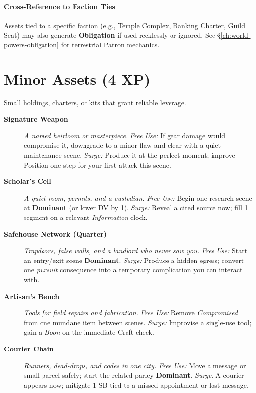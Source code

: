 \paragraph{Cross‑Reference to Faction Ties}
Assets tied to a specific faction (e.g., Temple Complex, Banking Charter, Guild Seat) may also generate \textbf{Obligation} if used recklessly or ignored. See \S\ref{ch:world-powers-obligation} for terrestrial Patron mechanics.

\section{Minor Assets (4 XP)}
Small holdings, charters, or kits that grant reliable leverage.
\begin{description}
  \item[\textbf{Signature Weapon}]  \emph{A named heirloom or masterpiece.} \emph{Free Use:} If gear damage would compromise it, downgrade to a minor flaw and clear with a quiet maintenance scene. \emph{Surge:} Produce it at the perfect moment; improve Position one step for your first attack this scene.

  \item[\textbf{Scholar's Cell}]  \emph{A quiet room, permits, and a custodian.} \emph{Free Use:} Begin one research scene at \textbf{Dominant} (or lower DV by 1). \emph{Surge:} Reveal a cited source now; fill 1 segment on a relevant \emph{Information} clock.

  \item[\textbf{Safehouse Network (Quarter)}]  \emph{Trapdoors, false walls, and a landlord who never saw you.} \emph{Free Use:} Start an entry/exit scene \textbf{Dominant}. \emph{Surge:} Produce a hidden egress; convert one \emph{pursuit} consequence into a temporary complication you can interact with.

  \item[\textbf{Artisan's Bench}]  \emph{Tools for field repairs and fabrication.} \emph{Free Use:} Remove \emph{Compromised} from one mundane item between scenes. \emph{Surge:} Improvise a single-use tool; gain a \emph{Boon} on the immediate Craft check.

  \item[\textbf{Courier Chain}]  \emph{Runners, dead-drops, and codes in one city.} \emph{Free Use:} Move a message or small parcel safely; start the related parley \textbf{Dominant}. \emph{Surge:} A courier appears now; mitigate 1 SB tied to a missed appointment or lost message.


\end{description}
